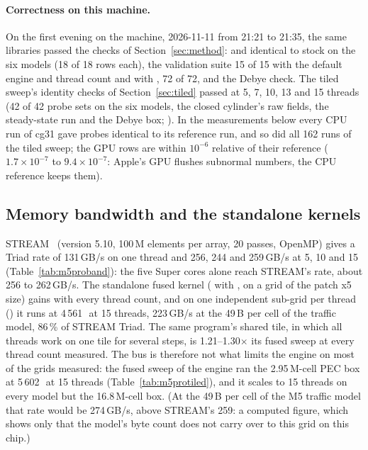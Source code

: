 \paragraph{Correctness on this machine.} On the first evening on the machine, 2026-11-11 from 21:21 to 21:35, the same
libraries passed the checks of Section~\ref{sec:method}:  and
 identical to stock on the six models (18 of 18 rows each), the validation suite 15 of 15 with
the default engine and thread count and with ,  72 of 72, and the Debye check.
The tiled sweep's identity checks of Section~\ref{sec:tiled} passed at 5, 7, 10, 13 and 15 threads (42 of 42 probe
sets on the six models, the closed cylinder's raw fields, the steady-state run and the Debye box;
). In the measurements below every CPU run of cg31 gave probes
identical to its reference run, and so did all 162 runs of the tiled sweep; the GPU rows are within $10^{-6}$ relative
of their reference ($1.7\times10^{-7}$ to $9.4\times10^{-7}$: Apple's GPU flushes subnormal numbers, the CPU reference
keeps them).

\subsection*{Memory bandwidth and the standalone kernels}
STREAM~\cite{stream} (version 5.10, 100\,M elements per array, 20 passes, OpenMP) gives a Triad rate of 131\,GB/s on
one thread and 256, 244 and 259\,GB/s at 5, 10 and 15 (Table~\ref{tab:m5proband}): the five Super cores alone reach
STREAM's rate, about 256 to 262\,GB/s. The standalone fused kernel ( with
, on a grid of the patch x5 size) gains with every thread count, and on one independent sub-grid per
thread () it runs at 4\,561\,\MC\ at 15 threads, 223\,GB/s at the 49\,B per cell of the traffic
model, 86\,\% of STREAM Triad. The same program's shared tile, in which all threads work on one tile for several
steps, is 1.21--1.30$\times$ its fused sweep at every thread count measured. The bus is therefore not what limits the engine on
most of the grids measured: the fused sweep of the engine ran the 2.95\,M-cell PEC box at 5\,602\,\MC\ at 15 threads
(Table~\ref{tab:m5protiled}), and it scales to 15 threads on every model but the 16.8\,M-cell box. (At the 49\,B
per cell of the M5 traffic model that rate would be 274\,GB/s, above STREAM's 259: a computed figure, which shows only
that the model's byte count does not carry over to this grid on this chip.)

